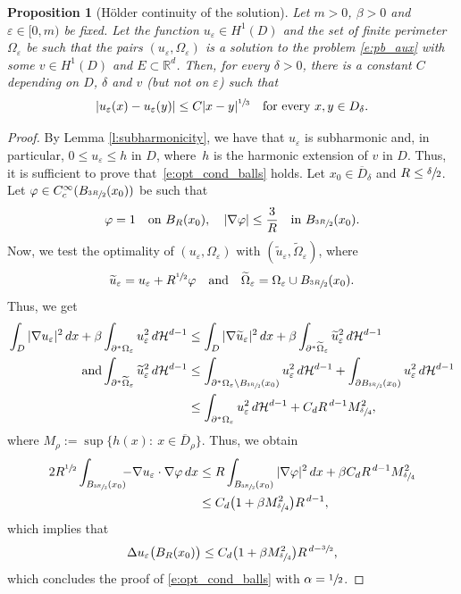 \documentclass[11pt]{article}
\numberwithin{equation}{section}
\theoremstyle{plain}
\newtheorem{prop}[teo]{Proposition}
\theoremstyle{definition}
\let\eps\varepsilon
\def\R{\mathbb{R}}
\def\HH{\mathcal{H}}
\begin{document}
\begin{prop}[Hölder continuity of the solution]\label{p:holder}
Let $m\!>\!0$, $\beta\!>\!0$ and $\eps\!\in\![0,m)$ be fixed. Let the function $u_\eps\in H^1(D)$ and the set of finite perimeter $\Omega_\eps$ be such that the pairs $(u_\eps,\Omega_\eps)$ is a solution to the problem \eqref{e:pb_aux} with some $v\in H^1(D)$ and $E\subset \R^d$. Then, for every $\delta>0$, there is a constant $C$ depending on $D$, $\delta$ and $v$ (but not on $\eps$) such that
\[|u_\eps(x)-u_\eps(y)|\le C|x-y|^{\sfrac13}\quad\text{for every } x,y\in D_\delta.\]
\end{prop}
\begin{proof}
By Lemma \ref{l:subharmonicity}, we have that $u_\eps$ is subharmonic and, in particular, $0\!\le\!u_\eps\!\le\!h$ in $D$, where~$h$ is the harmonic extension of $v$ in $D$. Thus, it is sufficient to prove that~\eqref{e:opt_cond_balls} holds. Let $x_0\in \overline D_\delta$ and $R\le \sfrac\delta2$. Let $\varphi\in C^\infty_c(B_{\sfrac{3R}2}(x_0))$ be such that
\[\varphi=1\quad\text{on } B_R(x_0),\quad |\nabla \varphi|\le \frac{3}{R}\quad\text{in } B_{\sfrac{3R}2}(x_0).\]
Now, we test the optimality of $(u_\eps,\Omega_\eps)$ with $(\widetilde u_\eps,\widetilde \Omega_\eps)$, where
\[\widetilde u_\eps=u_\eps+R^{\sfrac12}\varphi\quad\text{and}\quad \widetilde \Omega_\eps=\Omega_\eps\cup B_{\sfrac{3R}2}(x_0).\]
Thus, we get
\begin{align*}
\int_{D}|\nabla u_\eps|^2\,dx+\beta\int_{\partial^\ast\Omega_\eps}u_\eps^2\,d\HH^{d-1}&\le \int_{D}|\nabla \widetilde u_\eps|^2\,dx+\beta\int_{\partial^\ast\widetilde \Omega_\eps}\widetilde u_\eps^2\,d\HH^{d-1}\\
\tag*{and}
\int_{\partial^\ast\widetilde \Omega_\eps}\widetilde u_\eps^2\,d\HH^{d-1}&\le \int_{\partial^\ast \Omega_\eps\setminus B_{\sfrac{3R}2}(x_0)} u_\eps^2\,d\HH^{d-1}+\int_{\partial B_{\sfrac{3R}2}(x_0)} u_\eps^2\,d\HH^{d-1}\\
&\le \int_{\partial^\ast\Omega_\eps}u_\eps^2\,d\HH^{d-1}+C_d R^{\,d-1}M_{\sfrac{\delta}4}^2,
\end{align*}
where $M_\rho:=\sup\big\{h(x):\ x\in \overline D_\rho\big\}.$
Thus, we obtain
\begin{align*}
2R^{\sfrac12}\int_{B_{\sfrac{3R}2}(x_0)}\!\!\!-\nabla u_\eps\cdot\nabla \varphi\,dx&\le R\int_{B_{\sfrac{3R}2}(x_0)}|\nabla \varphi|^2\,dx+\beta C_dR^{\,d-1}M_{\sfrac{\delta}4}^2\\
&\le C_d\big(1+\beta M_{\sfrac{\delta}4}^2\big)R^{\,d-1},
\end{align*}
which implies that
\[\Delta u_\eps\big(B_R(x_0)\big)\le C_d\big(1+\beta M_{\sfrac{\delta}4}^2\big)R^{\,d-\sfrac32},\]
which concludes the proof of \eqref{e:opt_cond_balls} with $\alpha=\sfrac12$.
\end{proof}
\end{document}
